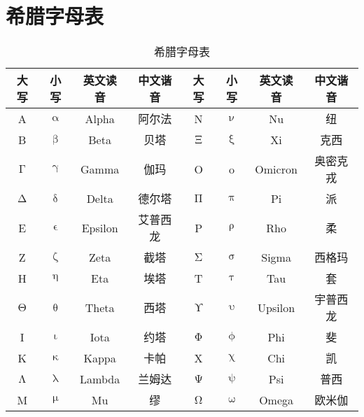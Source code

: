 \documentclass[b5paper,zihao=-4]{ctexbook}
\begin{document}
\appendix

\chapter{希腊字母表}
\begin{table}[h!]
	\centering
	\begin{tabularx}{\textwidth}{|c|c|C|C||c|c|C|C|}
		\hline
		\textbf{大写} & \textbf{小写} & \textbf{英文读音} & \textbf{中文谐音} & \textbf{大写} & \textbf{小写} & \textbf{英文读音} & \textbf{中文谐音} \\ \hline
		A & $\upalpha$ & Alpha & 阿尔法 & N & $\upnu$ & Nu & 纽 \\ \hline
		B & $\upbeta$ & Beta & 贝塔 & $\upXi$ & $\upxi$ & Xi & 克西 \\ \hline
		$\upGamma$ & $\upgamma$ & Gamma & 伽玛 & O & o & Omicron & 奥密克戎 \\ \hline
		$\upDelta$ & $\updelta$ & Delta & 德尔塔 & $\upPi$ & $\uppi$ & Pi & 派 \\ \hline
		E & $\upvarepsilon$ & Epsilon & 艾普西龙 & P & $\uprho$ & Rho & 柔 \\ \hline
		Z & $\upzeta$ & Zeta & 截塔 & $\upSigma$ & $\upsigma$ & Sigma & 西格玛 \\ \hline
		H & $\upeta$ & Eta & 埃塔 & T & $\uptau$ & Tau & 套 \\ \hline
		$\upTheta$ & $\uptheta$ & Theta & 西塔 & $\upUpsilon$ & $\upupsilon$ & Upsilon & 宇普西龙 \\ \hline
		I & $\upiota$ & Iota & 约塔 & $\upPhi$ & $\upphi$ & Phi & 斐 \\ \hline
		K & $\upkappa$ & Kappa & 卡帕 & X & $\upchi$ & Chi & 凯 \\ \hline
		$\upLambda$ & $\uplambda$ & Lambda & 兰姆达 & $\upPsi$ & $\uppsi$ & Psi & 普西 \\ \hline
		M & $\upmu$ & Mu & 缪 & $\upOmega$ & $\upomega$ & Omega & 欧米伽 \\ \hline
	\end{tabularx}
	\caption{希腊字母表}
	\label{tab:greeks}
\end{table}
\end{document}

